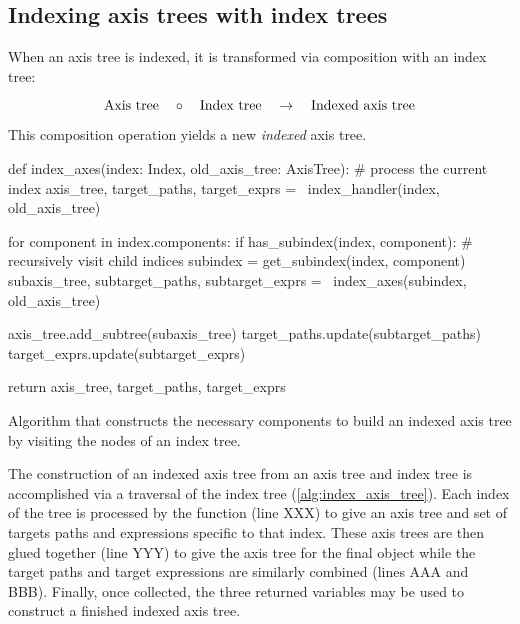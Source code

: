 \documentclass[thesis]{subfiles}
\begin{document}

\subsection{Indexing axis trees with index trees}

When an axis tree is indexed, it is transformed via composition with an index tree:

\begin{equation*}
  \textnormal{Axis tree} \quad \circ \quad \textnormal{Index tree} \quad \to \quad \textnormal{Indexed axis tree}
\end{equation*}

This composition operation yields a new \textit{indexed} axis tree.

\begin{algorithm}
  \begin{pyalg2}
    def index_axes(index: Index, old_axis_tree: AxisTree):
      # process the current index
      axis_tree, target_paths, target_exprs = \
        index_handler(index, old_axis_tree)

      for component in index.components:
        if has_subindex(index, component):
          # recursively visit child indices
          subindex = get_subindex(index, component)
          subaxis_tree, subtarget_paths, subtarget_exprs = \
            index_axes(subindex, old_axis_tree)

          axis_tree.add_subtree(subaxis_tree)
          target_paths.update(subtarget_paths)
          target_exprs.update(subtarget_exprs)

      return axis_tree, target_paths, target_exprs
  \end{pyalg2}

  \caption{
    Algorithm that constructs the necessary components to build an indexed axis tree by visiting the nodes of an index tree.
  }
  \label{alg:index_axis_tree}
\end{algorithm}

The construction of an indexed axis tree from an axis tree and index tree is accomplished via a traversal of the index tree (\cref{alg:index_axis_tree}).
Each index of the tree is processed by the function  (line XXX) to give an axis tree and set of targets paths and expressions specific to that index.
These axis trees are then glued together (line YYY) to give the axis tree for the final object while the target paths and target expressions are similarly combined (lines AAA and BBB).
Finally, once collected, the three returned variables may be used to construct a finished indexed axis tree.
\end{document}
